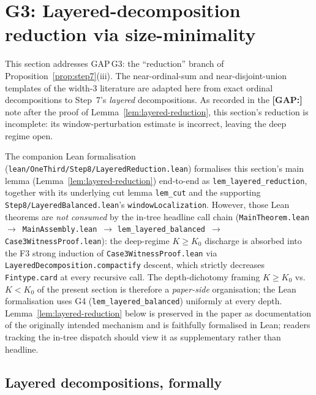 \section{G3: Layered-decomposition reduction via size-minimality}
\label{sec:layered-reduction}

This section addresses GAP\,G3: the ``reduction'' branch of
Proposition~\ref{prop:step7}(iii). The near-ordinal-sum and
near-disjoint-union templates of the width-3 literature are adapted
here from exact ordinal decompositions to Step~7's \emph{layered}
decompositions. As recorded in the \textbf{[GAP:]} note after the
proof of Lemma~\ref{lem:layered-reduction}, this section's reduction
is incomplete: its window-perturbation estimate is incorrect, leaving
the deep regime open.

\begin{remark}\label{rem:g3-paper-only}
The companion Lean formalisation
(\texttt{lean/OneThird/Step8/LayeredReduction.lean}) formalises
this section's main lemma (Lemma~\ref{lem:layered-reduction})
end-to-end as \texttt{lem\_layered\_reduction}, together with its
underlying cut lemma \texttt{lem\_cut} and the supporting
\texttt{Step8/LayeredBalanced.lean}'s \texttt{windowLocalization}.
However, those Lean theorems are \emph{not consumed} by the in-tree
headline call chain
(\texttt{MainTheorem.lean}~$\to$~\texttt{MainAssembly.lean}~$\to$
\texttt{lem\_layered\_balanced}~$\to$ \texttt{Case3WitnessProof.lean}):
the deep-regime $K \ge K_0$ discharge is absorbed into the F3
strong induction of \texttt{Case3WitnessProof.lean} via
\texttt{LayeredDecomposition.compactify} descent, which strictly
decreases \texttt{Fintype.card} at every recursive call. The
depth-dichotomy framing $K \ge K_0$ vs.\ $K < K_0$ of the present
section is therefore a \emph{paper-side} organisation; the Lean
formalisation uses G4 (\texttt{lem\_layered\_balanced}) uniformly at
every depth. Lemma~\ref{lem:layered-reduction} below is preserved in
the paper as documentation of the originally intended mechanism and
is faithfully formalised in Lean; readers tracking the in-tree
dispatch should view it as supplementary rather than headline.
\end{remark}

\subsection{Layered decompositions, formally}

